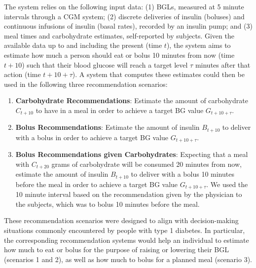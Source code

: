 \documentclass[journal,article,submit,moreauthors,pdftex]{Definitions/mdpi}
\begin{document}
The system relies on the following input data: (1) BGLs, measured at 5 minute intervals through a CGM system; (2) discrete deliveries of insulin (boluses) and continuous infusions of insulin (basal rates), recorded by an insulin pump; and (3) meal times and carbohydrate estimates, self-reported by subjects. Given the available data up to and including the present (time $t$), the system aims to estimate how much a person should eat or bolus 10 minutes from now (time $t+10$) such that their blood glucose will reach a target level $\tau$ minutes after that action (time $t + 10 + \tau$). A system that computes these estimates could then be used in the following three recommendation scenarios:
\begin{enumerate}
    \item {\bf Carbohydrate Recommendations}: Estimate the amount of carbohydrate $C_{t+10}$ to have in a meal in order to achieve a target BG value $G_{t+10+\tau}$.
    \item {\bf Bolus Recommendations}: Estimate the amount of insulin $B_{t+10}$ to deliver with a bolus in order to achieve a target BG value $G_{t+10+\tau}$.
    \item {\bf Bolus Recommendations given Carbohydrates}: Expecting that a meal with $C_{t+20}$ grams of carbohydrate will be consumed 20 minutes from now, estimate the amount of insulin $B_{t+10}$ to deliver with a bolus 10 minutes before the meal in order to achieve a target BG value $G_{t+10+\tau}$. We used the 10 minute interval based on the recommendation given by the physician to the subjects, which was to bolus 10 minutes before the meal.
\end{enumerate}
These recommendation scenarios were designed to align with decision-making situations commonly encountered by people with type 1 diabetes. In particular, the corresponding recommendation systems would help an individual to estimate how much to eat or bolus for the purpose of raising or lowering their BGL (scenarios 1 and 2), as well as how much to bolus for a planned meal (scenario 3). 

\end{document}
